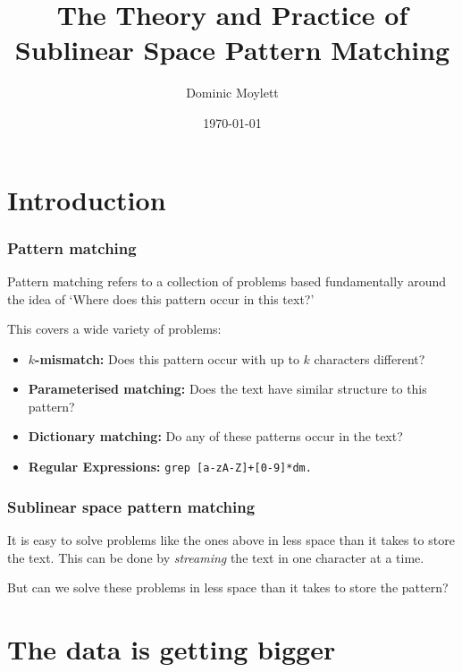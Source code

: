 \documentclass{beamer}
\title[Sublinear Space Pattern Matching]{The Theory and Practice of Sublinear Space Pattern Matching} %
\author{Dominic Moylett} %
\institute[University of Bristol] %
{
University of Bristol \\ %
\medskip
\textit{dominic.moylett.2011@my.bristol.ac.uk} %
}
\date{\today} %
\begin{document}
\begin{frame}
\titlepage %
\end{frame}


\section{Introduction}

\begin{frame}
\frametitle{Pattern matching}
Pattern matching refers to a collection of problems based fundamentally around the idea of `Where does this pattern occur in this text?'

This covers a wide variety of problems:
\begin{itemize}
    \item \textbf{$k$-mismatch:} Does this pattern occur with up to $k$ characters different?
    \item \textbf{Parameterised matching:} Does the text have similar structure to this pattern?
    \item \textbf{Dictionary matching:} Do any of these patterns occur in the text?
    \item \textbf{Regular Expressions:} \texttt{grep [a-zA-Z]+[0-9]*dm.}
\end{itemize}
\end{frame}


\begin{frame}
\frametitle{Sublinear space pattern matching}
It is easy to solve problems like the ones above in less space than it takes to store the text. This can be done by \textit{streaming} the text in one character at a time.

But can we solve these problems in less space than it takes to store the pattern?
\end{frame}

\section{The data is getting bigger}
\end{document}
